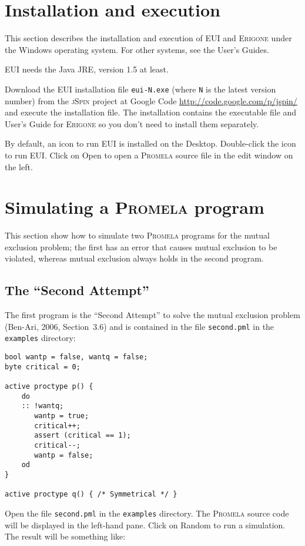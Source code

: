 \documentclass[11pt]{article}
\newcommand*{\prg}{\textsc{Erigone}}
\newcommand*{\eui}{\textsc{EUI}}
\newcommand*{\jsp}{\textsc{jSpin}}
\newcommand*{\prm}{\textsc{Promela}}
\newcommand*{\p}[1]{\texttt{#1}}
\newcommand*{\bu}[1]{\textsf{#1}}
\begin{document}
\section{Installation and execution}

This section describes the installation and execution of \eui{} and \prg{}
under the Windows operating system. For other systems, see the User's Guides.

\eui{} needs the Java JRE, version 1.5 at least. 

Download the \eui{} installation file \p{eui-N.exe} (where \p{N} is the
latest version number) from the \jsp{} project at Google Code
\url{http://code.google.com/p/jspin/} and execute the installation file.
The installation contains the executable file and User's Guide for
\prg{} so you don't need to install them separately.

By default, an icon to run \eui{} is installed on the Desktop.
Double-click the icon to run \eui{}. Click on \bu{Open} to open a \prm{}
source file in the edit window on the left.

\section{Simulating a \prm{} program}

This section show how to simulate two \prm{} programs for the mutual
exclusion problem; the first has an error that causes mutual exclusion
to be violated, whereas mutual exclusion always holds in the second
program.

\subsection*{The ``Second Attempt''}

The first program is the ``Second Attempt'' to solve the mutual
exclusion problem (Ben-Ari, 2006, Section~3.6) and is contained in
the file \p{second.pml} in the \p{examples} directory:

\begin{verbatim}
bool wantp = false, wantq = false;
byte critical = 0; 

active proctype p() {
    do 
    :: !wantq;
       wantp = true;
       critical++;
       assert (critical == 1);
       critical--;
       wantp = false;
    od
}

active proctype q() { /* Symmetrical */ }
\end{verbatim}

Open the file \p{second.pml} in the \p{examples} directory. The \prm{}
source code will be displayed in the left-hand pane. Click on
\bu{Random} to run a simulation. The result will be something like:
\end{document}
